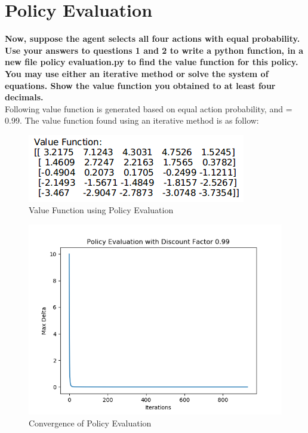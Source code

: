 \documentclass[11pt]{article}
\begin{document}
\section{Policy Evaluation}
\textbf{Now, suppose the agent selects all four actions with equal probability. Use your
answers to questions 1 and 2 to write a python function, in a new file policy
evaluation.py to find the value function for this policy. You may use either an
iterative method or solve the system of equations. Show the value function you
obtained to at least four decimals.}
\\

\noindent
Following value function is generated based on equal action probability, and  =
0.99. The value function found using an iterative method is as follow:
\\

\begin{figure}[h]
\includegraphics[scale=0.6]{v_evaluation}
\centering
\caption{Value Function using Policy Evaluation}
\end{figure}

\begin{figure}[h]
\includegraphics[scale=0.7]{policy_eval}
\centering
\caption{Convergence of Policy Evaluation}
\end{figure}
\end{document}
